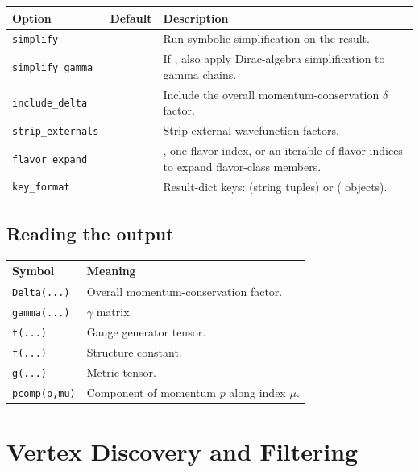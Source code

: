 \begin{center}
\begin{tabular}{@{}P{3.3cm}lp{7.5cm}@{}}
\toprule
\normalfont\textbf{Option} & \textbf{Default} & \textbf{Description} \\
\midrule
\texttt{simplify}         &   & Run symbolic simplification on the result. \\
\texttt{simplify\_gamma}  &  & If , also apply Dirac-algebra simplification to gamma chains. \\
\texttt{include\_delta}   &  & Include the overall momentum-conservation $\delta$ factor. \\
\texttt{strip\_externals} &   & Strip external wavefunction factors. \\
\texttt{flavor\_expand}   &  & , one flavor index, or an iterable of flavor indices to expand flavor-class members. \\
\texttt{key\_format}      &  & Result-dict keys:  (string tuples) or  ( objects). \\
\bottomrule
\end{tabular}
\end{center}

\subsection*{Reading the output}

\begin{center}
\begin{tabular}{@{}P{3cm}p{9.5cm}@{}}
\toprule
\normalfont\textbf{Symbol} & \textbf{Meaning} \\
\midrule
\texttt{Delta(...)}   & Overall momentum-conservation factor. \\
\texttt{gamma(...)}   & $\gamma$ matrix. \\
\texttt{t(...)}       & Gauge generator tensor. \\
\texttt{f(...)}       & Structure constant. \\
\texttt{g(...)}       & Metric tensor. \\
\texttt{pcomp(p,mu)}  & Component of momentum $p$ along index $\mu$. \\
\bottomrule
\end{tabular}
\end{center}

\section{Vertex Discovery and Filtering}
\label{sec:feynpy-discovery}

